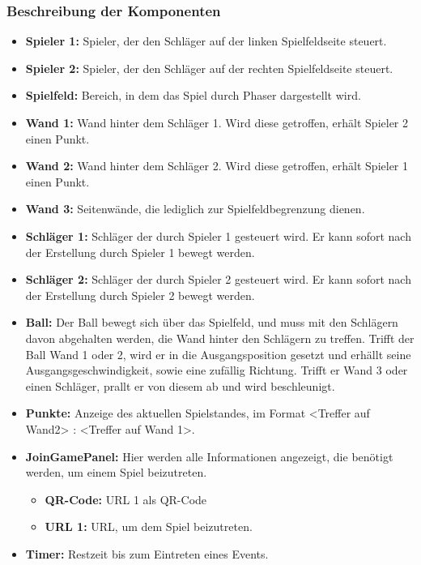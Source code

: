 		\subsubsection{Beschreibung der Komponenten}
		\begin{itemize}
			\item \textbf{Spieler 1:} Spieler, der den Schläger auf der linken Spielfeldseite steuert.
			\item \textbf{Spieler 2:} Spieler, der den Schläger auf der rechten Spielfeldseite steuert.
			\item \textbf{Spielfeld:} Bereich, in dem das Spiel durch Phaser dargestellt wird.
			\item \textbf{Wand 1:} Wand hinter dem Schläger 1. Wird diese getroffen, erhält Spieler 2 einen Punkt.
			\item \textbf{Wand 2:} Wand hinter dem Schläger 2. Wird diese getroffen, erhält Spieler 1 einen Punkt.
			\item \textbf{Wand 3:} Seitenwände, die lediglich zur Spielfeldbegrenzung dienen.
			\item \textbf{Schläger 1:} Schläger der durch Spieler 1 gesteuert wird. Er kann sofort nach der Erstellung durch Spieler 1 bewegt werden.
			\item \textbf{Schläger 2:} Schläger der durch Spieler 2 gesteuert wird. Er kann sofort nach der Erstellung durch Spieler 2 bewegt werden.
			\item \textbf{Ball:} Der Ball bewegt sich über das Spielfeld, und muss mit den Schlägern davon abgehalten werden, die Wand hinter den Schlägern zu treffen. Trifft der Ball Wand 1 oder 2, wird er in die Ausgangsposition gesetzt und erhällt seine Ausgangsgeschwindigkeit, sowie eine zufällig Richtung. Trifft er Wand 3 oder einen Schläger, prallt er von diesem ab und wird beschleunigt.
			\item \textbf{Punkte:} Anzeige des aktuellen Spielstandes, im Format <Treffer auf Wand2> : <Treffer auf Wand 1>.
			\item \textbf{JoinGamePanel:} Hier werden alle Informationen angezeigt, die benötigt werden, um einem Spiel beizutreten.
			\begin{itemize}
				\item \textbf{QR-Code:} URL 1 als QR-Code
				\item \textbf{URL 1:} URL, um dem Spiel beizutreten.
			\end{itemize}
			\item \textbf{Timer:} Restzeit bis zum Eintreten eines Events.
		\end{itemize}
